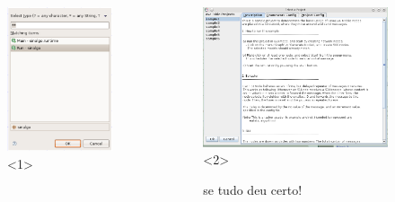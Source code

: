 \documentclass{beamer}
\begin{document}
\begin{frame}
\begin{columns}[c]
\begin{figure}[t]
	\includegraphics[width=1\linewidth]{img/run}<1>
\end{figure}

\begin{figure}[t]
	\includegraphics[width=1\linewidth]{img/menu}<2>
	\caption{se tudo deu certo!}
\end{figure}
\end{columns}

\end{frame}
\end{document}
